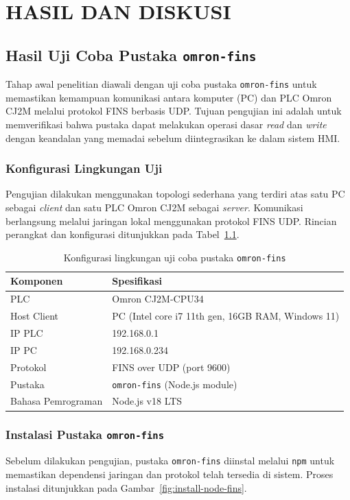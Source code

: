 \chapter{HASIL DAN DISKUSI}

\section{Hasil Uji Coba Pustaka \texttt{omron-fins}}

Tahap awal penelitian diawali dengan uji coba pustaka \texttt{omron-fins} untuk memastikan kemampuan komunikasi antara komputer (PC) dan PLC Omron CJ2M melalui protokol FINS berbasis UDP. Tujuan pengujian ini adalah untuk memverifikasi bahwa pustaka dapat melakukan operasi dasar \textit{read} dan \textit{write} dengan keandalan yang memadai sebelum diintegrasikan ke dalam sistem HMI.

\subsection{Konfigurasi Lingkungan Uji}
Pengujian dilakukan menggunakan topologi sederhana yang terdiri atas satu PC sebagai \textit{client} dan satu PLC Omron CJ2M sebagai \textit{server}. Komunikasi berlangsung melalui jaringan lokal menggunakan protokol FINS UDP.  
Rincian perangkat dan konfigurasi ditunjukkan pada Tabel~\ref{tab:uji-fins-env}.

\begin{table}[H]
\centering
\begin{tabular}{|l|l|}
\hline
\textbf{Komponen} & \textbf{Spesifikasi} \\ \hline
PLC & Omron CJ2M-CPU34 \\ \hline
Host Client & PC (Intel core i7 11th gen, 16GB RAM, Windows 11) \\ \hline
IP PLC & 192.168.0.1 \\ \hline
IP PC & 192.168.0.234 \\ \hline
Protokol & FINS over UDP (port 9600) \\ \hline
Pustaka & \texttt{omron-fins} (Node.js module) \\ \hline
Bahasa Pemrograman & Node.js v18 LTS \\ \hline
\end{tabular}
\caption{Konfigurasi lingkungan uji coba pustaka \texttt{omron-fins}}
\label{tab:uji-fins-env}
\end{table}

\subsection{Instalasi Pustaka \texttt{omron-fins}}
Sebelum dilakukan pengujian, pustaka \texttt{omron-fins} diinstal melalui \texttt{npm} untuk memastikan dependensi jaringan dan protokol telah tersedia di sistem. Proses instalasi ditunjukkan pada Gambar~\ref{fig:install-node-fins}.

